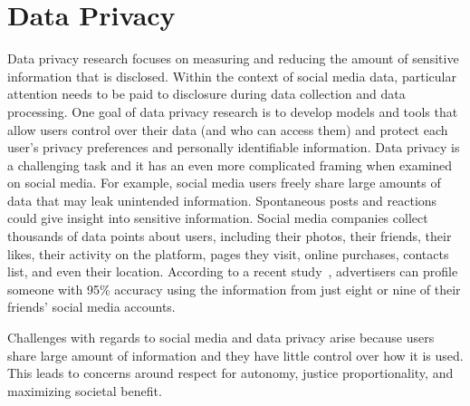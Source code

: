 \documentclass[11pt]{article} %
\begin{document}
\section{Data Privacy} 
\label{sec:privacy} 
Data privacy research focuses on measuring and reducing the amount of sensitive information that is disclosed. Within the context of social media data, particular attention needs to be paid to disclosure during data collection and data processing. One goal of data privacy research is to develop models and tools that allow users control over their data (and who can access them) and protect each user's privacy preferences and personally identifiable information. Data privacy is a challenging task and it has an even more complicated framing when examined on social media.
For example, social media users freely share large amounts of data that may leak unintended information.  Spontaneous posts and reactions could give insight into sensitive information. Social media companies collect thousands of data points about users, including their photos, their friends, their likes, their activity on the platform,  pages they visit, online purchases, contacts list, and even their location. According to a recent study~\cite{bagrow2019}, advertisers can profile someone with 95\% accuracy using the information from just eight or nine of their friends’ social media accounts. 

Challenges with regards to social media and data privacy arise because users share large amount of information and they have little control over how it is used. This leads to concerns around respect for autonomy, justice proportionality, and maximizing societal benefit.
\end{document}
